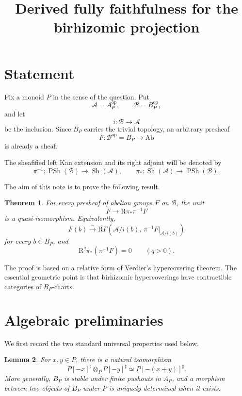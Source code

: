 \documentclass{article}
\newtheorem{theorem}{Theorem}[section]
\newtheorem{lemma}[theorem]{Lemma}
\theoremstyle{definition}
\theoremstyle{remark}
\newcommand{\op}{{\mathrm{op}}}
\newcommand{\Sh}{\operatorname{Sh}}
\newcommand{\PSh}{\operatorname{PSh}}
\newcommand{\Ab}{\mathrm{Ab}}
\newcommand{\R}{\mathrm{R}}
\begin{document}
\title{Derived fully faithfulness for the birhizomic projection}
\author{}
\date{}
\maketitle

\section{Statement}

Fix a monoid \(P\) in the sense of the question.  Put
\[
\mathcal A=A_P^{\op},\qquad \mathcal B=B_P^{\op},
\]
and let
\[
i:\mathcal B\longrightarrow \mathcal A
\]
be the inclusion.  Since \(B_P\) carries the trivial topology, an arbitrary presheaf
\[
F:\mathcal B^{\op}=B_P\longrightarrow \Ab
\]
is already a sheaf.

The sheafified left Kan extension and its right adjoint will be denoted by
\[
\pi^{-1}:\PSh(\mathcal B)\longrightarrow \Sh(\mathcal A),
\qquad
\pi_*:\Sh(\mathcal A)\longrightarrow \PSh(\mathcal B).
\]

The aim of this note is to prove the following result.

\begin{theorem}\label{thm:main}
For every presheaf of abelian groups \(F\) on \(\mathcal B\), the unit
\[
F\longrightarrow \R\pi_*\pi^{-1}F
\]
is a quasi-isomorphism.  Equivalently,
\[
F(b)\xrightarrow{\sim}
\R\Gamma\!\left(\mathcal A/i(b),\,\pi^{-1}F|_{\mathcal A/i(b)}\right)
\]
for every \(b\in B_P\), and
\[
\R^q\pi_*(\pi^{-1}F)=0\qquad(q>0).
\]
\end{theorem}

The proof is based on a relative form of Verdier's hypercovering theorem.  The essential geometric point is that birhizomic hypercoverings have contractible categories of \(B_P\)-charts.

\section{Algebraic preliminaries}

We first record the two standard universal properties used below.

\begin{lemma}\label{lem:face-pushouts}
For \(x,y\in P\), there is a natural isomorphism
\[
P[-x]^\sharp\otimes_P P[-y]^\sharp
\simeq P[-(x+y)]^\sharp .
\]
More generally, \(B_P\) is stable under finite pushouts in \(A_P\), and a morphism between two objects of \(B_P\) under \(P\) is uniquely determined when it exists.
\end{lemma}
\end{document}
